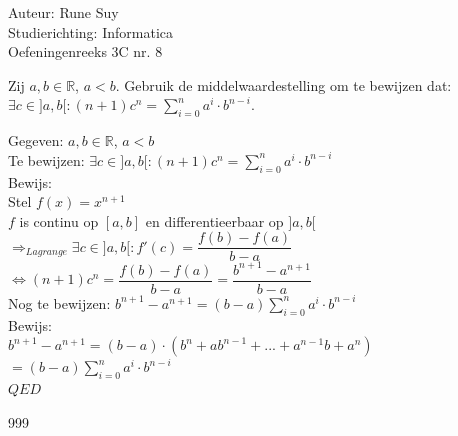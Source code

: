 \documentclass[a4paper]{article}
\begin{document}
  
\noindent \large Auteur: Rune Suy \\
\noindent \large Studierichting: Informatica\\
\noindent \large Oefeningenreeks 3C nr. 8\\

\medskip

\normalsize

Zij $a, b \in \mathbb{R}$, $a<b$. Gebruik de middelwaardestelling om te bewijzen dat: \\

$\exists c \in ]a, b[ : (n+1) c^n = \sum_{i=0}^{n} a^i \cdot b^{n-i}$.\\

\bigskip

Gegeven: $a, b \in \mathbb{R}$, $a<b$\\

Te bewijzen: $\exists c \in ]a, b[ : (n+1) c^n = \sum_{i=0}^{n} a^i \cdot b^{n-i}$\\

Bewijs:\\

Stel $f(x) = x^{n+1}$\\

$f$ is continu op $[a, b]$ en differentieerbaar op $]a, b[$\\

$\Rightarrow_{Lagrange} \exists c \in ]a,b[ : f'(c) = \dfrac{f(b) - f(a)}{b-a}$\\

$\Leftrightarrow (n+1)c^n = \dfrac{f(b) - f(a)}{b-a} = \dfrac{b^{n+1} - a^{n+1}}{b-a}$\\

Nog te bewijzen: $b^{n+1} - a^{n+1} = (b-a)\displaystyle\sum_{i=0}^{n} a^i \cdot b^{n-i}$\\

Bewijs: \\

$b^{n+1} - a^{n+1} = (b-a)\cdot(b^n + ab^{n-1} + ... + a^{n-1}b + a^n)$\\

$= (b-a)\sum_{i=0}^{n} a^i \cdot b^{n-i}$\\

$QED$


\begin{thebibliography}{999}
\end{thebibliography}
\end{document}
